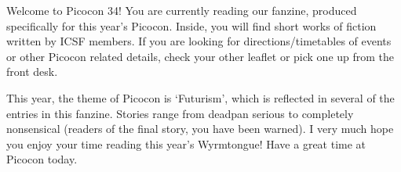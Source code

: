 Welcome to Picocon 34! You are currently reading our fanzine, produced specifically for this year's Picocon. Inside, you will find short works of fiction written by ICSF members. If you are looking for directions/timetables of events or other Picocon related details, check your other leaflet or pick one up from the front desk.

This year, the theme of Picocon is `Futurism', which is reflected in several of the entries in this fanzine. Stories range from deadpan serious to completely nonsensical (readers of the final story, you have been warned). I very much hope you enjoy your time reading this year's Wyrmtongue! Have a great time at Picocon today. 

